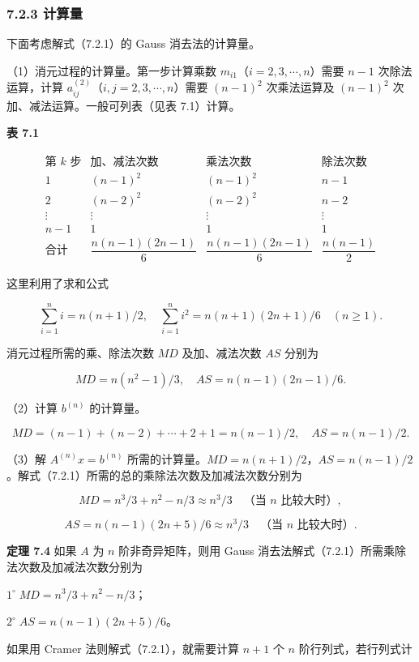 \documentclass[
  10pt,
  fontset=fandol]{ctexart}
\begin{document}
\subsubsection{7.2.3 计算量}\label{ux8ba1ux7b97ux91cf}

下面考虑解式（7.2.1）的 Gauss 消去法的计算量。

（1）消元过程的计算量。第一步计算乘数 \(m_{i1}\)（\(i=2,3,\cdots,n\)）需要 \(n-1\) 次除法运算，计算 \(a_{ij}^{(2)}\)（\(i,j=2,3,\cdots,n\)）需要 \((n-1)^2\) 次乘法运算及 \((n-1)^2\) 次加、减法运算。一般可列表（见表 7.1）计算。

\textbf{表 7.1}

\[
\begin{array}{c|c|c|c}
\text{第 }k\text{ 步}&\text{加、减法次数}&\text{乘法次数}&\text{除法次数}\\\hline
1&(n-1)^2&(n-1)^2&n-1\\
2&(n-2)^2&(n-2)^2&n-2\\
\vdots&\vdots&\vdots&\vdots\\
n-1&1&1&1\\\hline
\text{合计}&\dfrac{n(n-1)(2n-1)}{6}&\dfrac{n(n-1)(2n-1)}{6}&\dfrac{n(n-1)}{2}
\end{array}
\]

这里利用了求和公式

\[\sum_{i=1}^{n}i=n(n+1)/2,\quad \sum_{i=1}^{n}i^2=n(n+1)(2n+1)/6\quad(n\ge1).\]

消元过程所需的乘、除法次数 \(MD\) 及加、减法次数 \(AS\) 分别为

\[MD=n(n^2-1)/3,\quad AS=n(n-1)(2n-1)/6.\]

（2）计算 \(b^{(n)}\) 的计算量。

\[MD=(n-1)+(n-2)+\cdots+2+1=n(n-1)/2,\quad AS=n(n-1)/2.\]

（3）解 \(A^{(n)}x=b^{(n)}\) 所需的计算量。\(MD=n(n+1)/2\)，\(AS=n(n-1)/2\)。解式（7.2.1）所需的总的乘除法次数及加减法次数分别为

\[MD=n^3/3+n^2-n/3\approx n^3/3\quad\text{（当 $n$ 比较大时）},\]

\[AS=n(n-1)(2n+5)/6\approx n^3/3\quad\text{（当 $n$ 比较大时）}.\]

\textbf{定理 7.4} 如果 \(A\) 为 \(n\) 阶非奇异矩阵，则用 Gauss 消去法解式（7.2.1）所需乘除法次数及加减法次数分别为

\(1^\circ\;MD=n^3/3+n^2-n/3\)；

\(2^\circ\;AS=n(n-1)(2n+5)/6\)。

如果用 Cramer 法则解式（7.2.1），就需要计算 \(n+1\) 个 \(n\) 阶行列式，若行列式计
\end{document}
